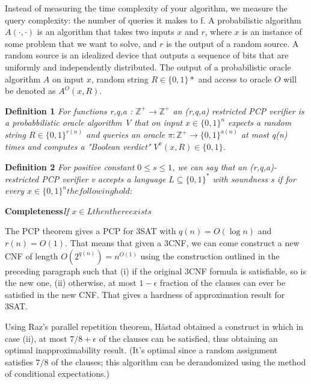 Instead of measuring the time complexity of your algorithm, we measure the query complexity: the number of queries it makes to f. A probabilistic algorithm $A(·, ·)$ is an algorithm that takes two inputs $x$ and $r$, where $x$ is an instance of some problem that we want to solve, and $r$ is the output of a random source. A random source is an idealized device that outputs a sequence of bits that are uniformly and independently distributed. The output of a probabilistic oracle algorithm $A$ on input $x$, random string $R \in \{0,1\}*$ and access to oracle $O$ will be denoted as $A^O(x,R)$.

\textbf{Definition 1} \textit{For functions r,q,a : $\mathbb{Z}^+ \rightarrow \mathbb{Z}^+$ an (r,q,a) restricted PCP verifier is a probabbilistic oracle algorithm V that on input $x \in \{0,1\}^n$ expects a random string $R \in \{0,1\}^{r(n)}$ and queries an oracle $\pi : \mathbb{Z}^+ \rightarrow \{0,1\}^{a(n)}$ at most q(n) times and computes a "Boolean verdict" $V^{\pi}(x,R) \in \{0,1\}$.}

\textbf{Definition 2} \textit{For positive constant $0 \leq s \leq 1$, we can say that an (r,q,a)-restricted PCP verifier v accepts a language $L \subseteq \{0,1\}^*$ with soundness s if for every $x \in \{0,1\}^n the following hold:$}

\textbf{Completeness}\textit{If $x \in L then there exists$}

The PCP theorem gives a PCP for 3SAT with $q(n) = O(\log n)$ and $r(n) = O(1)$. That means that given a 3CNF, we can come construct a new CNF of length $O(2^{q(n)}) = n^{O(1)}$ using the construction outlined in the preceding paragraph such that (i) if the original 3CNF formula is satisfiable, so is the new one, (ii) otherwise, at most $1-\epsilon$ fraction of the clauses can ever be satisfied in the new CNF. That gives a hardness of approximation result for 3SAT. 

Using Raz's parallel repetition theorem, Håstad obtained a construct in which in case (ii), at most $7/8+\epsilon$ of the clauses can be satisfied, thus obtaining an optimal inapproximability result. (It's optimal since a random assignment satisfies $7/8$ of the clauses; this algorithm can be derandomized using the method of conditional expectations.)
